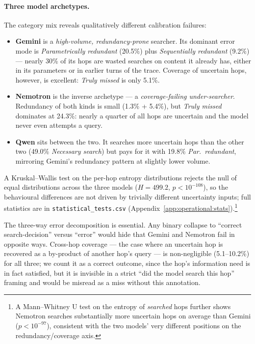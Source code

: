 \documentclass[10pt,letterpaper]{article}
\begin{document}
\paragraph{Three model archetypes.} The category mix reveals qualitatively different
calibration failures:
\begin{itemize}[leftmargin=*,itemsep=2pt]
\item \textbf{Gemini} is a \emph{high-volume, redundancy-prone} searcher. Its dominant
error mode is \emph{Parametrically redundant} (20.5\%) plus \emph{Sequentially redundant}
(9.2\%) --- nearly 30\% of its hops are wasted searches on content it already has, either
in its parameters or in earlier turns of the trace. Coverage of uncertain hops, however,
is excellent: \emph{Truly missed} is only 5.1\%.
\item \textbf{Nemotron} is the inverse archetype --- a \emph{coverage-failing
under-searcher}. Redundancy of both kinds is small (1.3\% + 5.4\%), but
\emph{Truly missed} dominates at 24.3\%: nearly a quarter of all hops are uncertain and
the model never even attempts a query.
\item \textbf{Qwen} sits between the two. It searches more uncertain hops than the
other two (49.0\% \emph{Necessary search}) but pays for it with 19.8\% \emph{Par.\
redundant}, mirroring Gemini's redundancy pattern at slightly lower volume.
\end{itemize}
A Kruskal--Wallis test on the per-hop entropy distributions rejects the null of equal
distributions across the three models ($H=499.2$, $p<10^{-108}$), so the behavioural
differences are not driven by trivially different uncertainty inputs; full statistics
are in \texttt{statistical\_tests.csv}
(Appendix~\ref{app:operational:stats}).\footnote{A Mann--Whitney U test on the entropy
of \emph{searched} hops further shows Nemotron searches substantially more uncertain
hops on average than Gemini ($p<10^{-97}$), consistent with the two models' very
different positions on the redundancy/coverage axis.}

The three-way error decomposition is essential. Any binary collapse to ``correct
search-decision'' versus ``error'' would hide that Gemini and Nemotron fail in
opposite ways. Cross-hop coverage --- the case where an uncertain hop is recovered as
a by-product of another hop's query --- is non-negligible (5.1--10.2\%) for all three;
we count it as a correct outcome, since the hop's information need is in fact
satisfied, but it is invisible in a strict ``did the model search this hop'' framing
and would be misread as a miss without this annotation.
\end{document}
